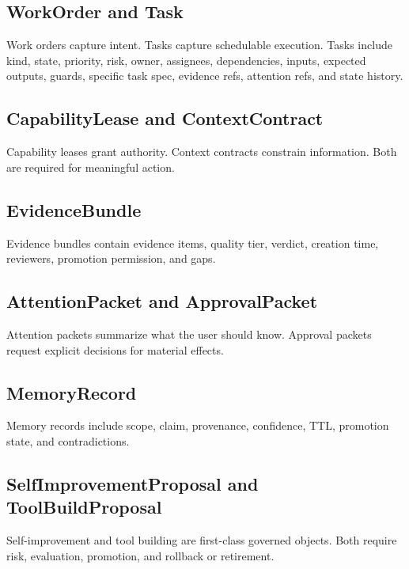 \documentclass[10pt,journal,onecolumn]{IEEEtran}
\begin{document}
\subsection{WorkOrder and Task}
Work orders capture intent. Tasks capture schedulable execution. Tasks include kind, state, priority, risk, owner, assignees, dependencies, inputs, expected outputs, guards, specific task spec, evidence refs, attention refs, and state history.

\subsection{CapabilityLease and ContextContract}
Capability leases grant authority. Context contracts constrain information. Both are required for meaningful action.

\subsection{EvidenceBundle}
Evidence bundles contain evidence items, quality tier, verdict, creation time, reviewers, promotion permission, and gaps.

\subsection{AttentionPacket and ApprovalPacket}
Attention packets summarize what the user should know. Approval packets request explicit decisions for material effects.

\subsection{MemoryRecord}
Memory records include scope, claim, provenance, confidence, TTL, promotion state, and contradictions.

\subsection{SelfImprovementProposal and ToolBuildProposal}
Self-improvement and tool building are first-class governed objects. Both require risk, evaluation, promotion, and rollback or retirement.
\end{document}
